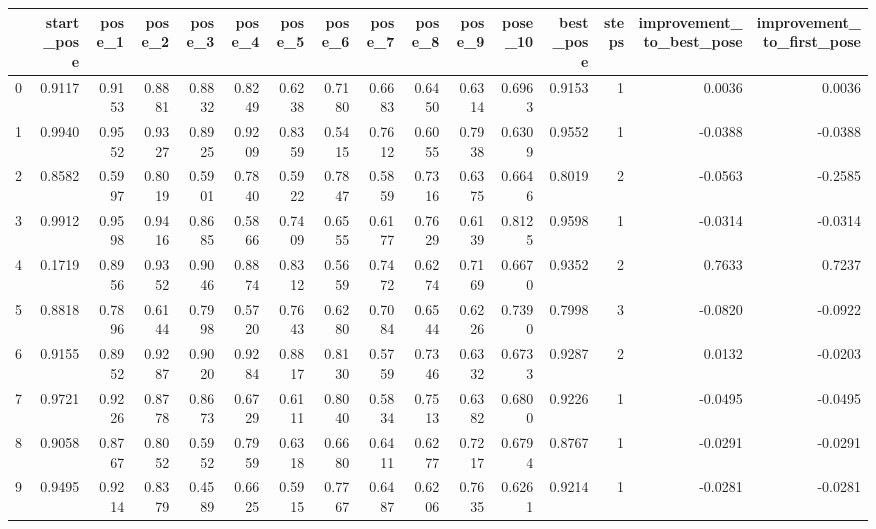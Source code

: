 \begin{tabular}{lrrrrrrrrrrrrrrr}
\toprule
{} &  start\_pose &  pose\_1 &  pose\_2 &  pose\_3 &  pose\_4 &  pose\_5 &  pose\_6 &  pose\_7 &  pose\_8 &  pose\_9 &  pose\_10 &  best\_pose &  steps &  improvement\_to\_best\_pose &  improvement\_to\_first\_pose \\
\midrule
0   &      0.9117 &  0.9153 &  0.8881 &  0.8832 &  0.8249 &  0.6238 &  0.7180 &  0.6683 &  0.6450 &  0.6314 &   0.6963 &     0.9153 &      1 &                    0.0036 &                     0.0036 \\
1   &      0.9940 &  0.9552 &  0.9327 &  0.8925 &  0.9209 &  0.8359 &  0.5415 &  0.7612 &  0.6055 &  0.7938 &   0.6309 &     0.9552 &      1 &                   -0.0388 &                    -0.0388 \\
2   &      0.8582 &  0.5997 &  0.8019 &  0.5901 &  0.7840 &  0.5922 &  0.7847 &  0.5859 &  0.7316 &  0.6375 &   0.6646 &     0.8019 &      2 &                   -0.0563 &                    -0.2585 \\
3   &      0.9912 &  0.9598 &  0.9416 &  0.8685 &  0.5866 &  0.7409 &  0.6555 &  0.6177 &  0.7629 &  0.6139 &   0.8125 &     0.9598 &      1 &                   -0.0314 &                    -0.0314 \\
4   &      0.1719 &  0.8956 &  0.9352 &  0.9046 &  0.8874 &  0.8312 &  0.5659 &  0.7472 &  0.6274 &  0.7169 &   0.6670 &     0.9352 &      2 &                    0.7633 &                     0.7237 \\
5   &      0.8818 &  0.7896 &  0.6144 &  0.7998 &  0.5720 &  0.7643 &  0.6280 &  0.7084 &  0.6544 &  0.6226 &   0.7390 &     0.7998 &      3 &                   -0.0820 &                    -0.0922 \\
6   &      0.9155 &  0.8952 &  0.9287 &  0.9020 &  0.9284 &  0.8817 &  0.8130 &  0.5759 &  0.7346 &  0.6332 &   0.6733 &     0.9287 &      2 &                    0.0132 &                    -0.0203 \\
7   &      0.9721 &  0.9226 &  0.8778 &  0.8673 &  0.6729 &  0.6111 &  0.8040 &  0.5834 &  0.7513 &  0.6382 &   0.6800 &     0.9226 &      1 &                   -0.0495 &                    -0.0495 \\
8   &      0.9058 &  0.8767 &  0.8052 &  0.5952 &  0.7959 &  0.6318 &  0.6680 &  0.6411 &  0.6277 &  0.7217 &   0.6794 &     0.8767 &      1 &                   -0.0291 &                    -0.0291 \\
9   &      0.9495 &  0.9214 &  0.8379 &  0.4589 &  0.6625 &  0.5915 &  0.7767 &  0.6487 &  0.6206 &  0.7635 &   0.6261 &     0.9214 &      1 &                   -0.0281 &                    -0.0281 \\

\end{tabular}
